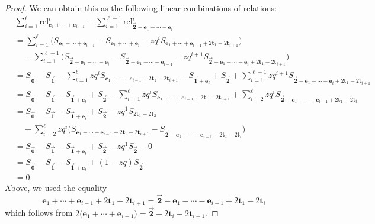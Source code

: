\documentclass[10pt,a4paper]{amsart}
\numberwithin{equation}{section}
\theoremstyle{definition}
\newcommand{\rel}{\text{rel}}
\newcommand{\tr}{\mathbf{t}}
\newcommand{\ee}{\mathbf{e}}
\newcommand{\two}{\vec{\mathbf{2}}}
\newcommand{\one}{\vec{\mathbf{1}}}
\newcommand{\zero}{\vec{\mathbf{0}}}
\begin{document}
\begin{proof}
We can obtain this as the following linear combinations of relations:
\begin{align*}
&\sum_{i=1}^\ell \rel^i_{\ee_1+\cdots+\ee_{i-1}} - \sum_{i=1}^{\ell-1}\rel^i_{\two-\ee_1-\cdots-\ee_i} \\
&=\sum_{i=1}^\ell \bigl(
S_{\ee_1+\cdots+\ee_{i-1}} - S_{\ee_1+\cdots+\ee_i} - zq^{i} S_{\ee_1+\cdots+\ee_{i-1}+2\tr_1-2\tr_{i+1}}\bigr) \\
&\quad- \sum_{i=1}^{\ell-1}\bigl(
S_{\two-\ee_1-\cdots-\ee_i} - S_{\two-\ee_1-\cdots-\ee_{i-1}} - zq^{i+1} S_{\two-\ee_1-\cdots-\ee_i+2\tr_1-2\tr_{i+1}}\bigr) \\
&=S_{\zero} - S_{\one} - \sum_{i=1}^\ell zq^{i} S_{\ee_1+\cdots+\ee_{i-1}+2\tr_1-2\tr_{i+1}} -
S_{\one+\ee_\ell} + S_{\two} + \sum_{i=1}^{\ell-1}zq^{i+1} S_{\two-\ee_1-\cdots-\ee_i+2\tr_1-2\tr_{i+1}} \\
&= S_{\zero} - S_{\one} -
S_{\one+\ee_\ell} + S_{\two} - \sum_{i=1}^\ell zq^{i} S_{\ee_1+\cdots+\ee_{i-1}+2\tr_1-2\tr_{i+1}} + \sum_{i=2}^{\ell}zq^{i} S_{\two-\ee_1-\cdots-\ee_{i-1}+2\tr_1-2\tr_{i}} \\
&= S_{\zero} - S_{\one} -
S_{\one+\ee_\ell} + S_{\two} -
 zq^{1} S_{2\tr_1-2\tr_{2}} \\
&\quad-\sum_{i=2}^\ell zq^{i} \bigl(S_{\ee_1+\cdots+\ee_{i-1}+2\tr_1-2\tr_{i+1}} -S_{\two-\ee_1-\cdots-\ee_{i-1}+2\tr_1-2\tr_{i}}\bigr) \\
&= S_{\zero} - S_{\one} -
S_{\one+\ee_\ell} + S_{\two} -
 zq^{1} S_{\two} -0 \\
&= S_{\zero} - S_{\one} - S_{\one+\ee_\ell} + (1-zq)S_{\two} \\
&= 0.
\end{align*}
Above, we used the equality
\begin{equation*}
\ee_1+\cdots+\ee_{i-1}+2\tr_1-2\tr_{i+1}={\two-\ee_1-\cdots-\ee_{i-1}+2\tr_1-2\tr_{i}}
\end{equation*} which follows from $
2\bigl(\ee_1+\cdots+\ee_{i-1}\bigr)=\two-2\tr_{i}+2\tr_{i+1}.$
\end{proof}
\end{document}
